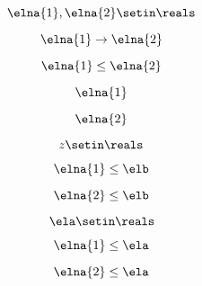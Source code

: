 {\begin{forslides}
        \begin{equation}
            \label{eq:combination-131}
            \elna{1},\elna{2}\setin \reals
        \end{equation}

        \begin{equation}
            \label{eq:combination-132}
            \elna{1}\to \elna{2}
        \end{equation}

        \begin{equation}
            \label{eq:combination-133}
            \elna{1}\leq \elna{2}
        \end{equation}

        \begin{equation}
            \label{eq:combination-134}
            \elna{1}
        \end{equation}

        \begin{equation}
            \label{eq:combination-135}
            \elna{2}
        \end{equation}

        \begin{equation}
            \label{eq:combination-136}
            z\setin \reals
        \end{equation}

        \begin{equation}
            \label{eq:combination-137}
            \elna{1}\leq \elb
        \end{equation}

        \begin{equation}
            \label{eq:combination-138}
            \elna{2}\leq \elb
        \end{equation}

        \begin{equation}
            \label{eq:combination-139}
            \ela\setin \reals
        \end{equation}

        \begin{equation}
            \label{eq:combination-140}
            \elna{1}\leq \ela
        \end{equation}

        \begin{equation}
            \label{eq:combination-141}
            \elna{2}\leq \ela
        \end{equation}


\end{forslides}}
